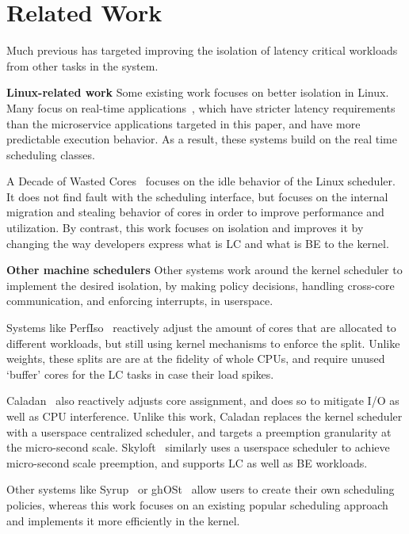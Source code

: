 \section{Related Work}

Much previous has targeted improving the isolation of latency critical workloads
from other tasks in the system.

\textbf{Linux-related work} Some existing work focuses on better isolation in
Linux. Many focus on real-time applications~\cite{rt-in-linux, state-rt-linux},
which have stricter latency requirements than the microservice applications
targeted in this paper, and have more predictable execution behavior. As a
result, these systems build on the real time scheduling classes.

A Decade of Wasted Cores~\cite{wasted-cores} focuses on the idle behavior of the
Linux scheduler. It does not find fault with the scheduling interface, but
focuses on the internal migration and stealing behavior of cores in order to
improve performance and utilization. By contrast, this work focuses on isolation
and improves it by changing the way developers express what is LC and what is BE
to the kernel.

\textbf{Other machine schedulers} Other systems work around the kernel scheduler
to implement the desired isolation, by making policy decisions, handling
cross-core communication, and enforcing interrupts, in userspace.

Systems like PerfIso~\cite{perfiso} reactively adjust the amount of cores that
are allocated to different workloads, but still using kernel mechanisms to
enforce the split. Unlike \cgroups{} weights, these splits are are at the
fidelity of whole CPUs, and require unused `buffer' cores for the LC tasks in
case their load spikes.

Caladan~\cite{caladan} also reactively adjusts core assignment, and does so to
mitigate I/O as well as CPU interference. Unlike this work, Caladan replaces the
kernel scheduler with a userspace centralized scheduler, and targets a
preemption granularity at the micro-second scale. Skyloft~\cite{skyloft}
similarly uses a userspace scheduler to achieve micro-second scale preemption,
and supports LC as well as BE workloads.

Other systems like Syrup~\cite{syrup} or ghOSt~\cite{ghost} allow users to
create their own scheduling policies, whereas this work focuses on an existing
popular scheduling approach and implements it more efficiently in the kernel. 



